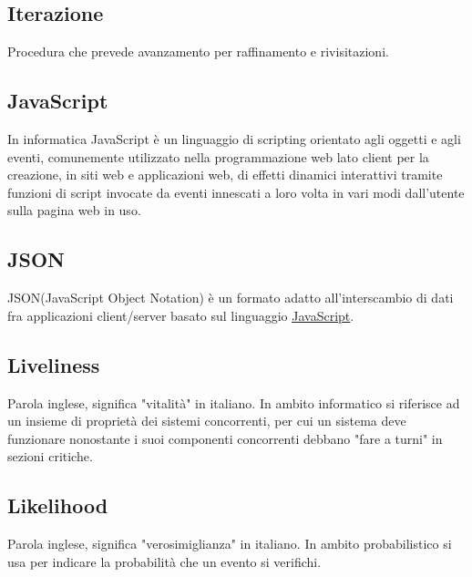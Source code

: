 	\subsection{Iterazione}
	\label{sec:iterazione}
	Procedura che prevede avanzamento per raffinamento e rivisitazioni.\newpage
	
	
	\subsection{JavaScript}
	\label{sec:javascript}
	In informatica JavaScript è un linguaggio di scripting orientato agli oggetti e agli eventi, comunemente utilizzato nella programmazione web lato client per la creazione, in siti web e applicazioni web, di effetti dinamici interattivi tramite funzioni di script invocate da eventi innescati a loro volta in vari modi dall'utente sulla pagina web in uso.
	
	\subsection{JSON}
	JSON(JavaScript Object Notation) è un formato adatto all'interscambio di dati fra applicazioni client/server basato sul linguaggio \underline{\hyperref[sec:javascript]{JavaScript}}.
	\newpage
	
	
	\subsection{Liveliness}
	\label{sec:liveliness}
	Parola inglese, significa "vitalità" in italiano. In ambito informatico si riferisce ad un insieme di proprietà dei sistemi concorrenti, per cui un sistema deve funzionare nonostante i suoi componenti concorrenti debbano "fare a turni" in sezioni critiche. 
	
	\subsection{Likelihood}
	\label{sec:likelihood}
	Parola inglese, significa "verosimiglianza" in italiano. In ambito probabilistico si usa per indicare la probabilità che un evento si verifichi. 

